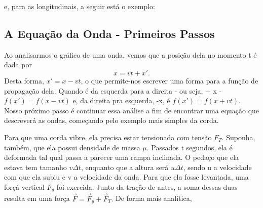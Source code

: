 \documentclass{article}
\begin{document}
\begin{center}
\end{center}

e, para as longitudinais, a seguir está o exemplo:

\begin{center}
\end{center}

\subsection{A Equação da Onda - Primeiros Passos}
  Ao analisarmos o gráfico de uma onda, vemos que a posição dela no momento t é dada por 
  \[
    x = vt + x'.
  \]
Desta forma, \(x' = x - vt\), o que permite-nos escrever uma forma para a função de propagação dela. Quando
é da esquerda para a direita - ou seja, + x - \(f(x') = f(x-vt)\) e, da direita pra esquerda, -x, é \(f(x') = f(x+vt)\).
Nosso próximo passo é continuar essa análise a fim de encontrar uma equação que descreverá as ondas, começando pelo exemplo
mais simples da corda.

 Para que uma corda vibre, ela precisa estar tensionada com tensão \(F_{T}\). Suponha, também, que ela possui densidade de massa \(\mu\).
Passados t segundos, ela é deformada tal qual passa a parecer uma rampa inclinada. O pedaço que ela estava tem tamanho
 \(v\Delta t\), enquanto que a altura será \(u\Delta t\), sendo u a velocidade com que ela subiu e v a velocidade da onda.
Para que ela fosse levantada, uma forçá vertical \(F_{y}\) foi exercida. Junto da tração de antes, a soma dessas duas resulta em uma
força \(\vec{F} = \vec{F}_{y} + \vec{F}_{T}.\) De forma mais analítica,
\end{document}

